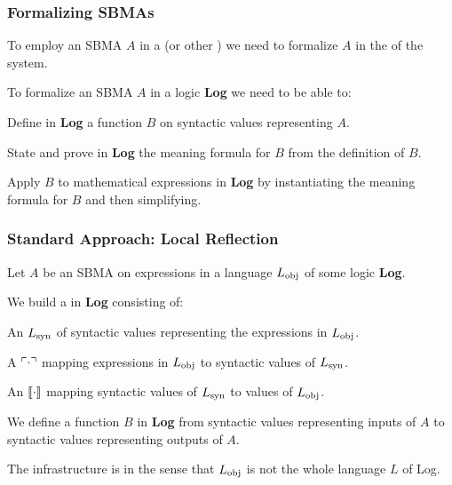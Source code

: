 \documentclass[t,12pt,numbers,fleqn]{beamer}
\begin{document}

\begin{frame}
\frametitle{Formalizing SBMAs}
\bi

  \item To employ an SBMA $A$ in a  (or
    other ) we need to formalize $A$
    in the  of the system.

\bigskip

  \item To formalize an SBMA $A$ in a logic \textbf{Log} we need
    to be able to:

  \be

    \item Define in \textbf{Log} a function $B$ on syntactic
      values representing $A$.

    \item State and prove in \textbf{Log} the meaning formula for
      $B$ from the definition of $B$.

    \item Apply $B$ to mathematical expressions in \textbf{Log} by
      instantiating the meaning formula for $B$ and then simplifying.

  \ee

\ei
\end{frame}


\begin{frame}
\frametitle{Standard Approach: Local Reflection}
\bi

  \item Let $A$ be an SBMA on expressions in a language $L_{\rm obj}$
    of some logic \textbf{Log}.

  \item We build a  in
    \textbf{Log} consisting of:

  \be

    \item An  $L_{\rm syn}$ of syntactic values
      representing the expressions in $L_{\rm obj}$.

    \item A  $\ulcorner\cdot\urcorner$ mapping
      expressions in $L_{\rm obj}$ to syntactic values of $L_{\rm
        syn}$.

    \item An  $\llbracket\cdot\rrbracket$
      mapping syntactic values of $L_{\rm syn}$ to values of $L_{\rm
        obj}$.

  \ee

  \item We define a function $B$ in \textbf{Log} from syntactic values
    representing inputs of $A$ to syntactic values representing
    outputs of $A$.

  \item The infrastructure is  in the sense that $L_{\rm
    obj}$ is not the whole language $L$ of Log.

\ei
\end{frame}
\end{document}
